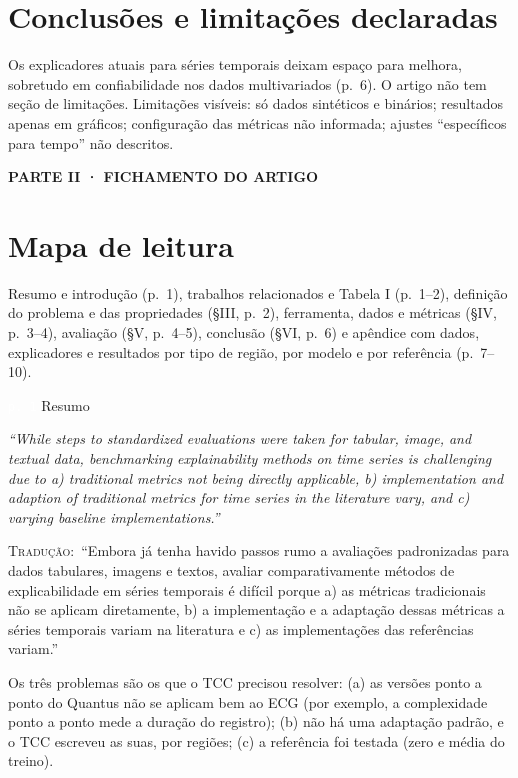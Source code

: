 \documentclass[11pt,a4paper]{article}
\newcommand{\pagechip}[1]{{\setlength{\fboxsep}{1.5pt}\colorbox{cAcc}{\textcolor{white}{\scriptsize\texttt{#1}}}}}
\newcommand{\partbar}[1]{\par\vspace{1.2em}\noindent\colorbox{black!80}{\parbox{\dimexpr\linewidth-2\fboxsep}{\color{white}\bfseries\sffamily\MakeUppercase{#1}}}\par\vspace{0.4em}}
\newenvironment{origquote}{\par\itshape\small}{\par}
\newenvironment{tradquote}{\par\small\textsc{Tradução:}\ }{\par}
\newcommand{\explab}[1]{\par\smallskip{\small\color{cAcc}\textbf{\MakeUppercase{#1}}}\par}
\begin{document}
\section{Conclusões e limitações declaradas}
Os explicadores atuais para séries temporais deixam espaço para melhora, sobretudo em confiabilidade nos dados multivariados (p.~6). O artigo não tem seção de limitações. Limitações visíveis: só dados sintéticos e binários; resultados apenas em gráficos; configuração das métricas não informada; ajustes ``específicos para tempo'' não descritos.

\partbar{Parte II · Fichamento do artigo}

\section{Mapa de leitura}
Resumo e introdução (p.~1), trabalhos relacionados e Tabela I (p.~1--2), definição do problema e das propriedades (§III, p.~2), ferramenta, dados e métricas (§IV, p.~3--4), avaliação (§V, p.~4--5), conclusão (§VI, p.~6) e apêndice com dados, explicadores e resultados por tipo de região, por modelo e por referência (p.~7--10).

\begin{citacard}{\pagechip{p. 1} Resumo}
\begin{origquote}“While steps to standardized evaluations were taken for tabular, image, and textual data, benchmarking explainability methods on time series is challenging due to a) traditional metrics not being directly applicable, b) implementation and adaption of traditional metrics for time series in the literature vary, and c) varying baseline implementations.”\end{origquote}
\begin{tradquote}“Embora já tenha havido passos rumo a avaliações padronizadas para dados tabulares, imagens e textos, avaliar comparativamente métodos de explicabilidade em séries temporais é difícil porque a) as métricas tradicionais não se aplicam diretamente, b) a implementação e a adaptação dessas métricas a séries temporais variam na literatura e c) as implementações das referências variam.”\end{tradquote}
\explab{Explicação}
Os três problemas são os que o TCC precisou resolver: (a) as versões ponto a ponto do Quantus não se aplicam bem ao ECG (por exemplo, a complexidade ponto a ponto mede a duração do registro); (b) não há uma adaptação padrão, e o TCC escreveu as suas, por regiões; (c) a referência foi testada (zero e média do treino).
\end{citacard}
\end{document}
